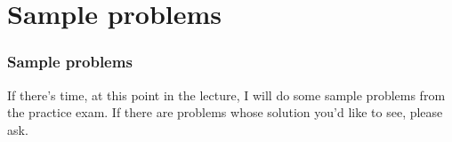 \documentclass{beamer}
\begin{document}
\section[Sample problems]{Sample problems}
\setcounter{subsection}{1}

\begin{frame}
  \frametitle{Sample problems}

  If there's time, at this point in the lecture, I will do some sample
  problems from the practice exam.  If there are problems whose
  solution you'd like to see, please ask.
\end{frame}
\end{document}
